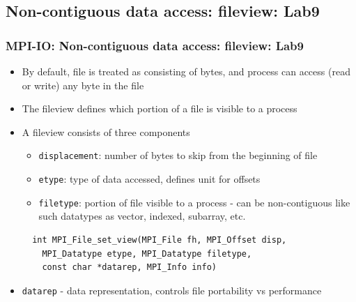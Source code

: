 \documentclass{beamer}
\begin{document}
\subsection{Non-contiguous data access: fileview: Lab9}
\begin{frame}[fragile]
  \frametitle{MPI-IO: Non-contiguous data access: fileview: Lab9}
\begin{itemize}
\item By default, file is treated as consisting of bytes, and
process can access (read or write) any byte in the file
\item The {\color{mycolordef}fileview} defines which portion of a file is visible to a
process
\item A fileview consists of three components
\begin{itemize}
\item {\color{mycolorcode}\verb|displacement|}: number of bytes to skip from the beginning
of file
\item {\color{mycolorcode}\verb|etype|}: type of data accessed, defines unit for offsets
\item {\color{mycolorcode}\verb|filetype|}: portion of file visible to a process - can be non-contiguous like such datatypes as vector, indexed, subarray, etc.
\end{itemize}
{\color{mycolorcode}
\begin{verbatim}
  int MPI_File_set_view(MPI_File fh, MPI_Offset disp, 
    MPI_Datatype etype, MPI_Datatype filetype, 
    const char *datarep, MPI_Info info)
\end{verbatim}
}
\item {\color{mycolorcode}\verb|datarep|} - data representation, controls file portability vs performance
\end{itemize}
\end{frame}
\end{document}
